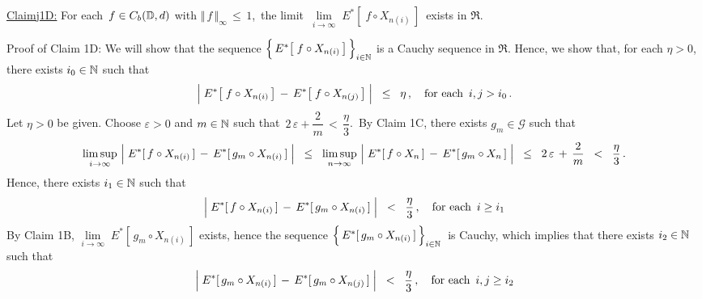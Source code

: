 \vskip 0.8cm
\begin{center}\begin{minipage}{6.5in}
\underline{Claim{{\color{white}j}}1D:}\;\;
For each \,$f \in C_{b}(\mathbb{D},d)$ with $\Vert\,f\,\Vert_{\infty} \,\leq\,1$,\,
the limit \,$\underset{i\rightarrow\infty}{\lim}\; E^{*}\!\left[\;f \circ X_{n(i)}\,\right]$\,
exists in $\Re$.
\end{minipage}\end{center}
Proof of Claim 1D:\;\;
We will show that the sequence
$\left\{\,\overset{{\color{white}.}}{E^{*}}\!\left[\;f \circ X_{n(i)}\,\right]\,\right\}_{i\in\N}$
is a Cauchy sequence in $\Re$.
Hence, we show that, for each $\eta > 0$, there exists $i_{0} \in \mathbb{N}$ such that
\begin{equation*}
\left\vert\; \overset{{\color{white}.}}{E^{*}}\!\left[\;f \circ X_{n(i)}\,\right] \,-\, E^{*}\!\left[\;f \circ X_{n(j)}\,\right] \;\right\vert
\;\; \leq \;\; \eta\,,
\quad
\textnormal{for each \,$i, j > i_{0}$}\,.
\end{equation*}
Let $\eta > 0$ be given. Choose $\varepsilon > 0$ and $m \in \mathbb{N}$ such that
\,$2\,\varepsilon + \dfrac{2}{m} \,<\, \dfrac{\eta}{3}$.\,
By Claim 1C, there exists $g_{m} \in \mathcal{G}$ such that
\begin{equation*}
\underset{i\rightarrow\infty}{\limsup}\,
\left\vert\; \overset{{\color{white}.}}{E^{*}}[\,f \circ X_{n(i)}\,] \,-\, E^{*}[\,g_{m} \circ X_{n(i)}\,] \;\right\vert
\;\; \leq \;\;
	\underset{n\rightarrow\infty}{\limsup}\,
	\left\vert\; \overset{{\color{white}.}}{E^{*}}[\,f \circ X_{n}\,] \,-\, E^{*}[\,g_{m} \circ X_{n}\,] \;\right\vert
\;\; \leq \;\;
	2\,\varepsilon \,+\, \dfrac{2}{m}
\;\; < \;\;
	\dfrac{\eta}{3}\,.
\end{equation*}
Hence, there exists $i_{1} \in \mathbb{N}$ such that
\begin{equation*}
\left\vert\; \overset{{\color{white}.}}{E^{*}}[\,f \circ X_{n(i)}\,] \,-\, E^{*}[\,g_{m} \circ X_{n(i)}\,] \;\right\vert
\;\; < \;\;
	\dfrac{\eta}{3}\,,
\quad
\textnormal{for each \,$i \geq i_{1}$}
\end{equation*}
By Claim 1B, $\underset{i\rightarrow\infty}{\lim}\;E^{*}[\,g_{m} \circ X_{n(i)}\,]$ exists,
hence the sequence $\left\{\,\overset{{\color{white}.}}{E^{*}}[\,g_{m} \circ X_{n(i)}\,]\,\right\}_{i\in\N}$\, is Cauchy,
which implies that there exists $i_{2} \in \mathbb{N}$ such that
\begin{equation*}
\left\vert\; \overset{{\color{white}.}}{E^{*}}[\,g_{m} \circ X_{n(i)}\,] \,-\, E^{*}[\,g_{m} \circ X_{n(j)}\,] \;\right\vert
\;\; < \;\;
	\dfrac{\eta}{3}\,,
\quad
\textnormal{for each \,$i,j \geq i_{2}$}
\end{equation*}
